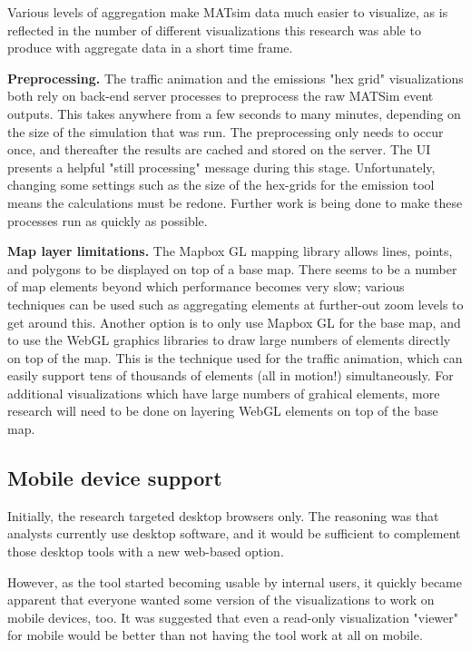 \documentclass[Afour,sageh,times]{sagej}
\begin{document}
Various levels of aggregation make MATsim data much easier to visualize, as is reflected in the number of different visualizations this research was able to produce with aggregate data in a short time frame.

\textbf{Preprocessing.} The traffic animation and the emissions "hex grid" visualizations both rely on back-end server processes to preprocess the raw MATSim event outputs. This takes anywhere from a few seconds to many minutes, depending on the size of the simulation that was run. The preprocessing only needs to occur once, and thereafter the results are cached and stored on the server. The UI presents a helpful "still processing" message during this stage. Unfortunately, changing some settings such as the size of the hex-grids for the emission tool means the calculations must be redone. Further work is being done to make these processes run as quickly as possible.

\textbf{Map layer limitations.} The Mapbox GL mapping library allows lines, points, and polygons to be displayed on top of a base map. There seems to be a number of map elements beyond which performance becomes very slow; various techniques can be used such as aggregating elements at further-out zoom levels to get around this. Another option is to only use Mapbox GL for the base map, and to use the WebGL graphics libraries to draw large numbers of elements directly on top of the map. This is the technique used for the traffic animation, which can easily support tens of thousands of elements (all in motion!) simultaneously. For additional visualizations which have large numbers of grahical elements, more research will need to be done on layering WebGL elements on top of the base map.

\subsection{Mobile device support}

Initially, the research targeted desktop browsers only. The reasoning was that analysts currently use desktop software, and it would be sufficient to complement those desktop tools with a new web-based option.

However, as the tool started becoming usable by internal users, it quickly became apparent that everyone wanted some version of the visualizations to work on mobile devices, too. It was suggested that even a read-only visualization "viewer" for mobile would be better than not having the tool work at all on mobile.
\end{document}
